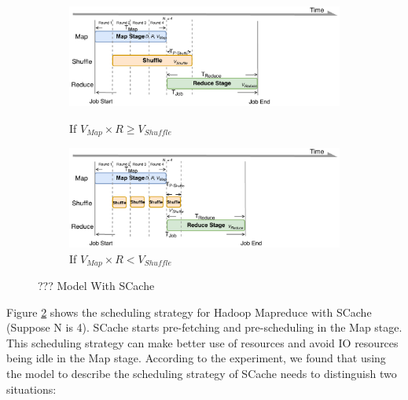 {\begin{figure}
	\centering
	\begin{minipage}[hb]{\linewidth}
		\begin{subfigure}{\linewidth}
			\begin{minipage}{\linewidth}
				\includegraphics[width=\linewidth]{fig/model_scache1}
				\caption{\color{blue}If \(V_{Map} \times R \ge V_{Shuffle}\)}
				\label{fig:model_scache1}
			\end{minipage}
			\begin{minipage}{\linewidth}
				\includegraphics[width=\linewidth]{fig/model_scache2}
				\caption{\color{blue}If \(V_{Map} \times R < V_{Shuffle}\)}
				\label{fig:model_scache2}
			\end{minipage}
		\end{subfigure}
		\caption{\color{blue}??? Model With SCache}
		\label{fig:model_scache}
	\end{minipage}
\end{figure}

Figure \ref{fig:model_scache} shows the scheduling strategy for Hadoop Mapreduce with SCache (Suppose N is 4). SCache starts pre-fetching and pre-scheduling in the Map stage. This scheduling strategy can make better use of resources and avoid IO resources being idle in the Map stage. According to the experiment, we found that using the model to describe the scheduling strategy of SCache needs to distinguish two situations:

}
